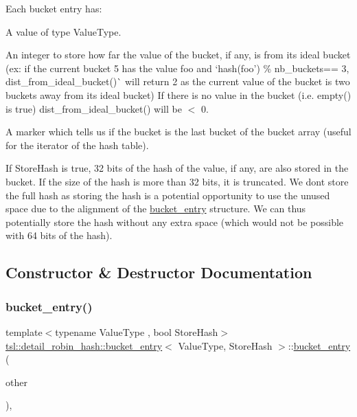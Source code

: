 Each bucket entry has\+:
\begin{DoxyItemize}
\item A value of type {\ttfamily Value\+Type}.
\item An integer to store how far the value of the bucket, if any, is from its ideal bucket (ex\+: if the current bucket 5 has the value \textquotesingle{}foo\textquotesingle{} and `hash(\textquotesingle{}foo') \% nb\+\_\+buckets{\ttfamily == 3, }dist\+\_\+from\+\_\+ideal\+\_\+bucket()\`{} will return 2 as the current value of the bucket is two buckets away from its ideal bucket) If there is no value in the bucket (i.\+e. {\ttfamily empty()} is true) {\ttfamily dist\+\_\+from\+\_\+ideal\+\_\+bucket()} will be $<$ 0.
\item A marker which tells us if the bucket is the last bucket of the bucket array (useful for the iterator of the hash table).
\item If {\ttfamily Store\+Hash} is true, 32 bits of the hash of the value, if any, are also stored in the bucket. If the size of the hash is more than 32 bits, it is truncated. We don\textquotesingle{}t store the full hash as storing the hash is a potential opportunity to use the unused space due to the alignment of the \mbox{\hyperlink{classtsl_1_1detail__robin__hash_1_1bucket__entry}{bucket\+\_\+entry}} structure. We can thus potentially store the hash without any extra space (which would not be possible with 64 bits of the hash). 
\end{DoxyItemize}

\subsection{Constructor \& Destructor Documentation}
\mbox{\label{classtsl_1_1detail__robin__hash_1_1bucket__entry_aef8661319886dd65cb3c50b3b7e2202d}} 
\subsubsection{\texorpdfstring{bucket\_entry()}{bucket\_entry()}}
{\footnotesize\ttfamily template$<$typename Value\+Type , bool Store\+Hash$>$ \\
\mbox{\hyperlink{classtsl_1_1detail__robin__hash_1_1bucket__entry}{tsl\+::detail\+\_\+robin\+\_\+hash\+::bucket\+\_\+entry}}$<$ Value\+Type, Store\+Hash $>$\+::\mbox{\hyperlink{classtsl_1_1detail__robin__hash_1_1bucket__entry}{bucket\+\_\+entry}} (\begin{DoxyParamCaption}\item[{\mbox{\hyperlink{classtsl_1_1detail__robin__hash_1_1bucket__entry}{bucket\+\_\+entry}}$<$ Value\+Type, Store\+Hash $>$ \&\&}]{other }\end{DoxyParamCaption})\hspace{0.3cm}{\ttfamily [inline]}, {\ttfamily [noexcept]}}


